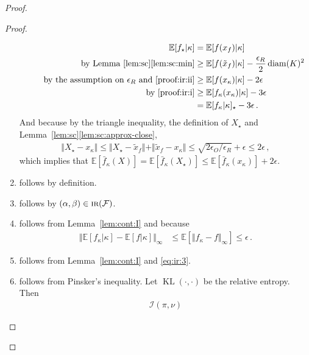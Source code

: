 \documentclass[letter, 12pt]{report}
\newcommand{\epsR}{{\epsilon_R}}
\newcommand{\epsO}{{\epsilon_O}}
\newcommand{\KL}{\operatorname{KL}}
\newcommand{\snorm}[1]{ \Vert  #1 \Vert}
\newcommand{\E}{\mathbb E}
\newcommand{\cF}{\mathcal F}
\newcommand{\diam}{\operatorname{diam}}
\newcommand{\I}{\mathcal{I}}
\newcommand{\1}{\mathbf{1}}
\newcommand{\IR}{\operatorname{\textsc{ir}}}
\theoremstyle{plain}
\theoremstyle{definition}
\theoremstyle{remark}
\begin{document}
\begin{proof}
\begin{proof}
\begin{enumerate}
                  \begin{align*}
                      \E[f_\star|\kappa]
                       & = \E[f(x_f)|\kappa]                                        \\
                      \tag*{by Lemma~\ref{lem:sc}\ref{lem:sc:min}}
                       & \geq \E[f(\tilde x_f)|\kappa] - \frac{\epsR}{2} \diam(K)^2 \\
                      \tag*{by the assumption on $\epsR$ and \ref{proof:ir:ii}}
                       & \geq \E[f(x_\kappa)|\kappa] - 2\epsilon                    \\
                      \tag*{by \ref{proof:ir:i}}
                       & \geq \E[f_\kappa(x_\kappa)|\kappa] - 3\epsilon             \\
                       & = \E[f_\kappa|\kappa]_\star - 3\epsilon \,.
                  \end{align*}
                  And because by the triangle inequality, the definition of $X_\star$ and Lemma~\ref{lem:sc}\ref{lem:sc:approx-close},
                  \begin{align}
                      \snorm{X_\star - x_\kappa}
                      \leq \snorm{X_\star - \tilde x_f} + \snorm{\tilde x_f - x_\kappa}
                      \leq \sqrt{2\epsO / \epsR} + \epsilon
                      \leq 2 \epsilon\,,
                      \label{eq:ir:3}
                  \end{align}
                  which implies that $\E[\bar f_\kappa(X)] = \E[\bar f_\kappa(X_\star)] \leq \E[\bar f_\kappa(x_\kappa)] + 2 \epsilon$.
            \item follows by definition.
            \item follows by $(\alpha, \beta) \in \IR(\cF)$.
            \item follows from Lemma~\ref{lem:cont:I} and because
                  \begin{align*}
                      \snorm{\E[f_\kappa|\kappa] - \E[f|\kappa]}_\infty
                       & \leq \E[\snorm{f_\kappa - f}_\infty] \leq \epsilon \,.
                  \end{align*}
            \item follows from Lemma~\ref{lem:cont:I} and \cref{eq:ir:3}.
            \item follows from Pinsker's inequality. Let $\KL(\cdot, \cdot)$ be the relative entropy. Then
                  \begin{align*}
                      \I(\pi, \nu)

\end{align*}
\end{enumerate}
\end{proof}
\end{proof}
\end{document}
